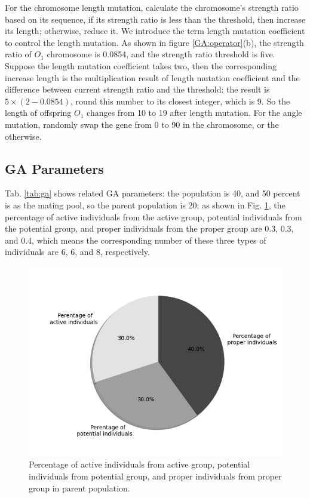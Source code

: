 For the chromosome length mutation, calculate the chromosome's strength ratio
based on its sequence, if its strength ratio is less than the threshold, then
increase its length; otherwise, reduce it. We introduce the term length
mutation coefficient to control the length mutation.  As shown in figure
\ref{GA:operator}(b), the strength ratio of $O_1$ chromosome is 0.0854, and the
strength ratio threshold is five. Suppose the length mutation coefficient takes
two, then the corresponding increase length is the multiplication result of
length mutation coefficient and the difference between current strength ratio
and the threshold: the result is $5\times(2-0.0854)$, round this number to its
closest integer, which is 9. So the length of offspring $O_1$ changes from 10
to 19 after length mutation.  For the angle mutation, randomly swap the gene
from 0 to 90 in the chromosome, or the otherwise.


\subsection{GA Parameters}
Tab. \ref{tab:ga} shows related GA parameters: the population is 40, and 50
percent is as the mating pool, so the parent population is 20; as
shown in Fig. \ref{fig:percentage}, the percentage of active individuals from
the active group, potential individuals from the potential group, and proper
individuals from the proper group are 0.3, 0.3, and 0.4, which means the
corresponding number of these three types of individuals are 6, 6, and 8,
respectively.

\begin{figure}[!tb]
	\centering
	\includegraphics[width=\linewidth]{fig/percentage_of_groups}
	\caption{Percentage of active individuals from active group, potential
	  individuals from potential group, and proper individuals from proper group
	 in parent population.}
	 \label{fig:percentage}
\end{figure}



